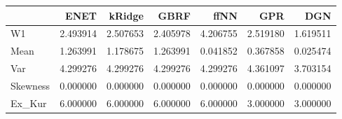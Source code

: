 \begin{tabular}{lrrrrrr}
\toprule
{} &      ENET &    kRidge &      GBRF &      ffNN &       GPR &       DGN \\
\midrule
W1       &  2.493914 &  2.507653 &  2.405978 &  4.206755 &  2.519180 &  1.619511 \\
Mean     &  1.263991 &  1.178675 &  1.263991 &  0.041852 &  0.367858 &  0.025474 \\
Var      &  4.299276 &  4.299276 &  4.299276 &  4.299276 &  4.361097 &  3.703154 \\
Skewness &  0.000000 &  0.000000 &  0.000000 &  0.000000 &  0.000000 &  0.000000 \\
Ex\_Kur   &  6.000000 &  6.000000 &  6.000000 &  6.000000 &  3.000000 &  3.000000 \\
\bottomrule
\end{tabular}
